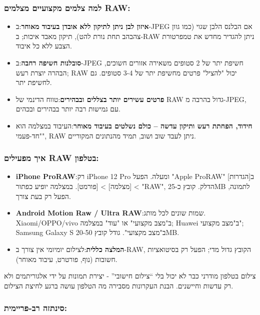 \subsubsection*{למה צלמים מקצועיים מצלמים RAW:}

\begin{itemize}
  \item \textbf{איזון לבן ניתן לתיקון ללא אובדן בעיבוד מאוחר}:ב-JPEG אם הבלנס הלבן שגוי (כמו גוון צהבהב תחת נורת להט), תיקון מאבד איכות; ב-RAW ניתן להגדיר מחדש את טמפרטורת הצבע ללא כל איבוד.
  \item \textbf{סובלנות חשיפה רחבה}:ב-JPEG חשיפת יתר של 2 סטופים משאירה אזורים חשוכים, הבהרה יוצרת רעש; RAW יכול "להציל" פרטים מחשיפת יתר של 3-4 סטופים. גם לחשיפת יתר.
  \item \textbf{פרטים עשירים יותר בצללים ובבהירים}:טווח הדינמי של RAW גדול בהרבה מ-JPEG, עם גמישות רבה יותר בבהירים ובכהים.
  \item \textbf{חידוד, הפחתת רעש ותיקון עדשה – כולם נשלטים בעיבוד מאוחר}:העיבוד במצלמה הוא "חד-פעמי", RAW ניתן לעבד שוב ושוב, תמיד מהנתונים המקוריים.
\end{itemize}

\subsubsection*{איך מפעילים RAW בטלפון:}

\begin{itemize}
  \item \textbf{iPhone ProRAW}:רק iPhone 12 Pro ומעלה. הפעל "Apple ProRAW" ב[הגדרות] > [מצלמה] > [פורמט]. במצלמה יופיע כפתור "RAW", הדלק. קובץ כ-25MB לתמונה, הפעל רק בעת צורך.
  \item \textbf{Android Motion Raw / Ultra RAW}:שמות שונים לכל מותג. Xiaomi/OPPO/vivo ב"מצב מקצועי" או "עוד" במצלמה; Huawei ב"מצב מקצועי"; Samsung Galaxy S ב"מצב מקצועי". גודל קובץ 20-50MB.
  \item \textbf{המלצה כללית}:לצילום יומיומי אין צורך ב-RAW, הקובץ גדול מדי; הפעל רק בסיטואציות חשובות (נוף, פורטרט, עיבוד מאוחר).
\end{itemize}


צילום בטלפון מודרני כבר לא יכול בלי “צילום חישובי” - יצירת תמונות על ידי אלגוריתמים ולא רק עדשות וחיישנים. הבנת העקרונות מסבירה מה הטלפון עושה ברגע לחיצת הצילום.

\subsubsection*{סינתזה רב-פריימית:}

